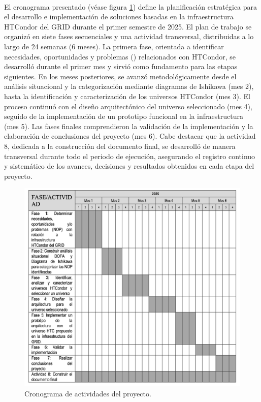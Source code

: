 \label{cap:cronograma}
\mbox{}\\
\noindent

El cronograma presentado (véase figura \ref{fig:cronograma}) define la planificación estratégica para el desarrollo e implementación de soluciones basadas en la infraestructura HTCondor del GRID durante el primer semestre de 2025. El plan de trabajo se organizó en siete fases secuenciales y una actividad transversal, distribuidas a lo largo de 24 semanas (6 meses). La primera fase, orientada a identificar necesidades, oportunidades y problemas (\NPO) relacionados con HTCondor, se desarrolló durante el primer mes y sirvió como fundamento para las etapas siguientes. En los meses posteriores, se avanzó metodológicamente desde el análisis situacional \DOFA y la categorización mediante diagramas de Ishikawa (mes 2), hasta la identificación y caracterización de los universos HTCondor (mes 3). El proceso continuó con el diseño arquitectónico del universo seleccionado (mes 4), seguido de la implementación de un prototipo funcional en la infraestructura \GRID (mes 5). Las fases finales comprendieron la validación de la implementación y la elaboración de conclusiones del proyecto (mes 6). Cabe destacar que la actividad 8, dedicada a la construcción del documento final, se desarrolló de manera transversal durante todo el periodo de ejecución, asegurando el registro continuo y sistemático de los avances, decisiones y resultados obtenidos en cada etapa del proyecto.

\begin{figure}[H]
	\centering
	\includegraphics[scale=0.5]{tablas-images/partes/01-generalidades/cronograma.png}
	\caption{Cronograma de actividades del proyecto.}\label{fig:cronograma}
\end{figure}
